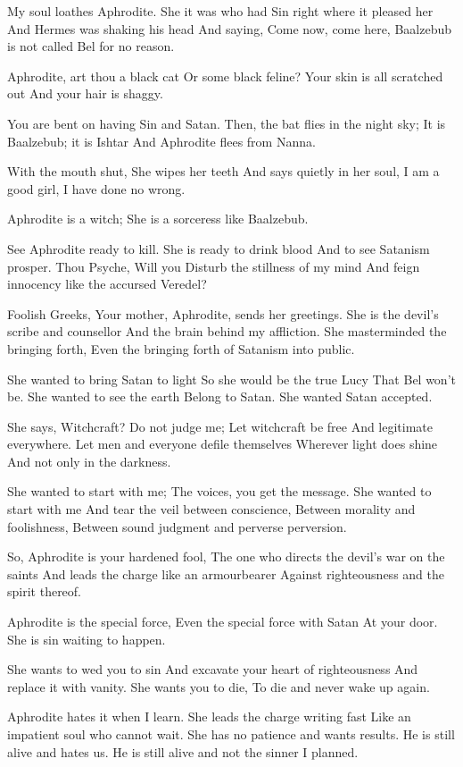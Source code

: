 \documentclass[
]{book}
\begin{document}
My soul loathes Aphrodite.
She it was who had Sin right where it pleased her
And Hermes was shaking his head
And saying, Come now, come here,
Baalzebub is not called Bel for no reason.

Aphrodite, art thou a black cat
Or some black feline?
Your skin is all scratched out
And your hair is shaggy.

You are bent on having Sin and Satan.
Then, the bat flies in the night sky;
It is Baalzebub; it is Ishtar
And Aphrodite flees from Nanna.

With the mouth shut,
She wipes her teeth
And says quietly in her soul,
I am a good girl, I have done no wrong.

Aphrodite is a witch;
She is a sorceress like Baalzebub.

See Aphrodite ready to kill.
She is ready to drink blood
And to see Satanism prosper.
Thou Psyche, Will you
Disturb the stillness of my mind
And feign innocency like the accursed Veredel?

Foolish Greeks,
Your mother, Aphrodite, sends her greetings.
She is the devil's scribe and counsellor
And the brain behind my affliction.
She masterminded the bringing forth,
Even the bringing forth of Satanism into public.

She wanted to bring Satan to light
So she would be the true Lucy
That Bel won't be.
She wanted to see the earth
Belong to Satan.
She wanted Satan accepted.

She says, Witchcraft? Do not judge me;
Let witchcraft be free
And legitimate everywhere.
Let men and everyone defile themselves
Wherever light does shine
And not only in the darkness.

She wanted to start with me;
The voices, you get the message.
She wanted to start with me
And tear the veil between conscience,
Between morality and foolishness,
Between sound judgment and perverse perversion.

So, Aphrodite is your hardened fool,
The one who directs the devil's war on the saints
And leads the charge like an armourbearer
Against righteousness and the spirit thereof.

Aphrodite is the special force,
Even the special force with Satan
At your door.
She is sin waiting to happen.

She wants to wed you to sin
And excavate your heart of righteousness
And replace it with vanity.
She wants you to die,
To die and never wake up again.

Aphrodite hates it when I learn.
She leads the charge writing fast
Like an impatient soul who cannot wait.
She has no patience and wants results.
He is still alive and hates us.
He is still alive and not the sinner I planned.
\end{document}
